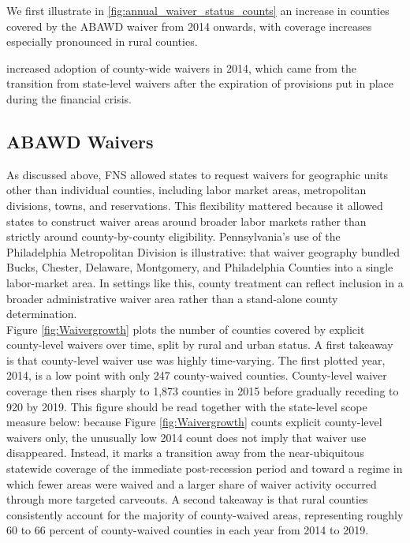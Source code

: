 \documentclass[12pt]{article}
\begin{document}
We first illustrate in \ref{fig:annual_waiver_status_counts} an increase in counties covered by the ABAWD waiver from 2014 onwards, with coverage increases especially pronounced in rural counties. 

increased adoption of county-wide waivers in 2014, which came from the transition from state-level waivers after the expiration of provisions put in place during the financial crisis.

\subsection{ABAWD Waivers}

As discussed above, FNS allowed states to request waivers for geographic units other than individual counties, including labor market areas, metropolitan divisions, towns, and reservations. This flexibility mattered because it allowed states to construct waiver areas around broader labor markets rather than strictly around county-by-county eligibility. Pennsylvania's use of the Philadelphia Metropolitan Division is illustrative: that waiver geography bundled Bucks, Chester, Delaware, Montgomery, and Philadelphia Counties into a single labor-market area. In settings like this, county treatment can reflect inclusion in a broader administrative waiver area rather than a stand-alone county determination.\\

Figure \ref{fig:Waivergrowth} plots the number of counties covered by explicit county-level waivers over time, split by rural and urban status. A first takeaway is that county-level waiver use was highly time-varying. The first plotted year, 2014, is a low point with only 247 county-waived counties. County-level waiver coverage then rises sharply to 1,873 counties in 2015 before gradually receding to 920 by 2019. This figure should be read together with the state-level scope measure below: because Figure \ref{fig:Waivergrowth} counts explicit county-level waivers only, the unusually low 2014 count does not imply that waiver use disappeared. Instead, it marks a transition away from the near-ubiquitous statewide coverage of the immediate post-recession period and toward a regime in which fewer areas were waived and a larger share of waiver activity occurred through more targeted carveouts. A second takeaway is that rural counties consistently account for the majority of county-waived areas, representing roughly 60 to 66 percent of county-waived counties in each year from 2014 to 2019.
\end{document}
